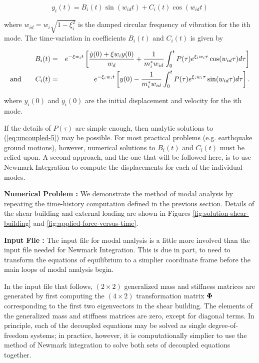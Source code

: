 \begin{equation}
y_i (t) = B_i (t) \sin( w_{id} t) + C_i (t) \cos( w_{id} t) 
\label{eq:uncoupled-5}
\end{equation}

\vspace{0.15 in}\noindent
where $w_{id} = w_i \sqrt{1 - \xi_i^2}$ is the damped circular frequency of
vibration for the ith mode.
The time-variation in coefficients $B_i(t)$ and $C_i(t)$ is given by

\begin{eqnarray}
B_i (t) &= & e^{-\xi w_i t}
\left[ {{{\dot y}(0) + \xi w_i y(0)}\over w_d} +
{1 \over m_i^* w_{id}} \int_0^{t} P(\tau)
e^{\xi_i w_i \tau} \cos(w_{id} \tau) d\tau \right] \\
\hbox{and}\qquad
C_i (t) &= & e^{-\xi_i w_i t} \left[ y(0) - {1 \over m_i^* w_{id}}
\int_0^{t} P(\tau) e^{\xi_i w_i \tau} \sin(w_{id} \tau) d\tau \right].
\end{eqnarray}

\vspace{0.15 in}\noindent
where $y_i(0)$ and $\dot{y}_i(0)$ are the
initial displacement and velocity for the ith mode.

\vspace{0.15 in}
\noindent\hspace{0.5 in}
If the details of $P(\tau)$ are simple enough,
then analytic solutions to (\ref{eq:uncoupled-5}) may be possible.
For most practical problems (e.g. earthquake ground motions),
however, numerical solutions to $B_i(t)$ and $C_i(t)$ must be relied upon.
A second approach, and the one that will be followed here,
is to use Newmark Integration to compute the
displacements for each of the individual modes.

\vspace{0.20 in}\noindent
{\bf Numerical Problem :}
We demonstrate the method of modal analysis by repeating the
time-history computation defined in the previous section.
Details of the shear building and external loading are shown in
Figures \ref{fig:solution-shear-building} and \ref{fig:applied-force-versus-time}.

\vspace{0.15 in}\noindent
{\bf Input File :} The input file for modal analysis is a little
more involved than the input file needed for Newmark Integration.
This is due in part, to need to transform the equations of equilibrium to a
simplier coordinate frame before the main loops of modal analysis begin.

\vspace{0.15 in}
\noindent\hspace{0.5 in}
In the input file that follows, $(2 \times 2)$ generalized mass and
stiffness matrices are generated by first computing the $(4 \times 2)$
transformation matrix ${\bf \Phi}$ corresponding to the
first two eigenvectors in the shear building.
The elements of the generalized mass and stiffness
matrices are zero, except for diagonal terms.
In principle, each of the decoupled equations may be solved
as single degree-of-freedom systems; in practice, however,
it is computationally simplier to use the method of Newmark
integration to solve both sets of decoupled equations together.

